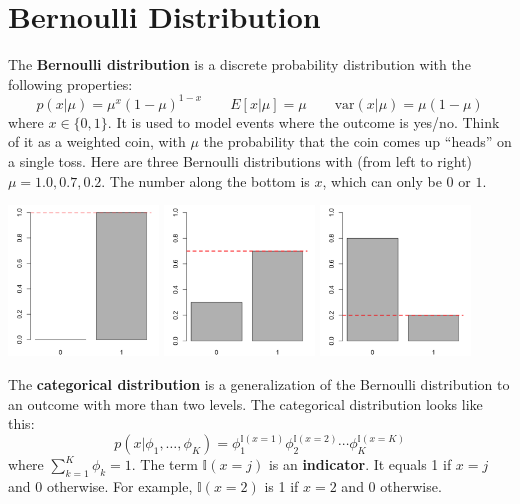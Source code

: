 \section{Bernoulli Distribution \label{sect:bernoulli}}

The \textbf{Bernoulli distribution} is a discrete probability distribution with the following properties:
$$ p(x|\mu) = \mu^x (1 - \mu) ^ {1-x} \qquad E[x| \mu] = \mu \qquad \text{var}(x | \mu) = \mu (1 - \mu) $$
where $x \in \{0, 1\}$. It is used to model events where the outcome is yes/no. Think of it as a weighted coin, with $\mu$ the probability that the coin comes up ``heads'' on a single toss. Here are three Bernoulli distributions with (from left to right) $\mu = 1.0, 0.7, 0.2$. The number along the bottom is $x$, which can only be $0$ or $1$. 
\begin{center}
\includegraphics[width=0.3\textwidth]{img/l01-figure2a-bernoulli-1-0.png}
\includegraphics[width=0.3\textwidth]{img/l01-figure2b-bernoulli-0-7.png}
\includegraphics[width=0.3\textwidth]{img/l01-figure2c-bernoulli-0-2.png}
\end{center}

The \textbf{categorical distribution} is a generalization of the Bernoulli distribution to an outcome with more than two levels. The categorical distribution looks like this:
$$ p(x|\phi_1, \dots, \phi_K) = \phi_1^{\mathbb{I}(x=1)} \phi_2^{\mathbb{I}(x=2)} \cdots \phi_K^{\mathbb{I}(x=K)} $$
where $\sum_{k=1}^K \phi_k = 1$. The term $\mathbb{I}(x=j)$ is an \textbf{indicator}. It equals 1 if $x=j$ and 0 otherwise. For example, $\mathbb{I}(x=2)$ is 1 if $x=2$ and 0 otherwise. 

